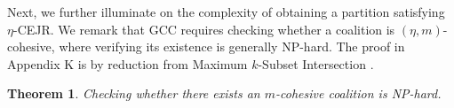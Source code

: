 \documentclass[letterpaper]{article} %
\newtheorem{theorem}{Theorem}
\begin{document}
Next, we further illuminate on the complexity of obtaining a partition satisfying $\eta$-CEJR. We remark that GCC requires checking whether a coalition is $(\eta, m)$-cohesive, where verifying its existence is generally NP-hard. The proof in Appendix K is by reduction from Maximum $k$-Subset Intersection \cite{xavier2012note}.
\begin{theorem}
    \label{thm:cohesive np hard}
    Checking whether there exists an $m$-cohesive coalition is NP-hard.
\end{theorem}
\end{document}

